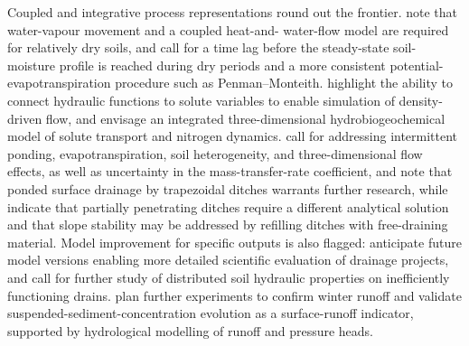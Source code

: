 \documentclass[11pt]{article}
\begin{document}
Coupled and integrative process representations round out the frontier.
\textcite{Moroizumi2004} note that water-vapour movement and a coupled heat-and-
water-flow model are required for relatively dry soils, and
\textcite{Koivusalo1999} call for a time lag before the steady-state soil-
moisture profile is reached during dry periods and a more consistent
potential-evapotranspiration procedure such as Penman--Monteith.
\textcite{Salo2015} highlight the ability to connect hydraulic functions to
solute variables to enable simulation of density-driven flow, and
\textcite{Varvaris2018} envisage an integrated three-dimensional
hydrobiogeochemical model of solute transport and nitrogen dynamics.
\textcite{Zhang2024} call for addressing intermittent ponding,
evapotranspiration, soil heterogeneity, and three-dimensional flow effects, as
well as uncertainty in the mass-transfer-rate coefficient, and
\textcite{Afruzi2014} note that ponded surface drainage by trapezoidal ditches
warrants further research, while \textcite{Chahar2010} indicate that partially
penetrating ditches require a different analytical solution and that slope
stability may be addressed by refilling ditches with free-draining material.
Model improvement for specific outputs is also flagged: \textcite{Verma2014}
anticipate future model versions enabling more detailed scientific evaluation
of drainage projects, and \textcite{Nousiainen2015} call for further study of
distributed soil hydraulic properties on inefficiently functioning drains.
\textcite{Augeard2005} plan further experiments to confirm winter runoff and
validate suspended-sediment-concentration evolution as a surface-runoff
indicator, supported by hydrological modelling of runoff and pressure heads.
\end{document}
